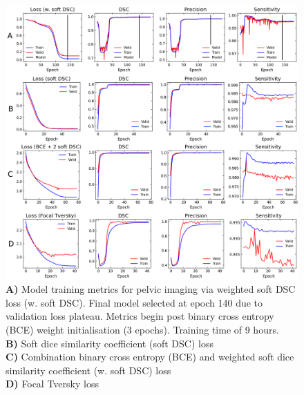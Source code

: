 \begin{figure}[H]
	\begin{center}
		\hspace*{-1.2cm}\includegraphics[width=1.15\textwidth]{figures/prostate_metrics_all}
		\caption{\textbf{A)} Model training metrics for pelvic imaging via weighted soft DSC loss (w. soft DSC). Final model selected at epoch 140 due to validation loss plateau. Metrics begin post binary cross entropy (BCE) weight initialisation (3 epochs). Training time of 9 hours. \\
		\textbf{B)} Soft dice similarity coefficient (soft DSC) loss \\
		\textbf{C)} Combination binary cross entropy (BCE) and weighted soft dice similarity coefficient (w. soft DSC) loss\\
		\textbf{D)}  Focal Tversky loss}
		\label{fig:prostate_metrics}
	\end{center}
\end{figure}


